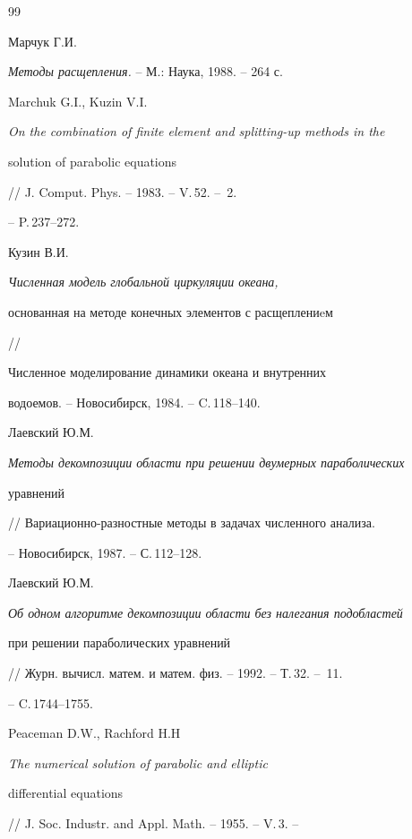 \begin{thebibliography}{99}







Марчук Г.И.


{\it Методы расщепления.} -- М.: Наука, 1988. -- 264 с.




Marchuk G.I., Kuzin V.I.


{\it On the combination of finite element and splitting-up methods in the


solution of parabolic equations}


// J. Comput. Phys. -- 1983. -- V.\,52. -- \No\,2.


-- P.\,237--272.




Кузин В.И. {\it Численная модель глобальной циркуляции океана,


основанная на методе конечных элементов с расщеплениeм} //


Численное моделирование динамики океана и внутренних


водоемов. -- Новосибирск, 1984. -- C.\,118--140.




Лаевский Ю.М.


{\it Методы декомпозиции области при решении двумерных параболических


уравнений}


// Вариационно-разностные методы в задачах численного анализа.


-- Новосибирск, 1987. -- С.\,112--128.




Лаевский Ю.М.


{\it Об одном алгоритме декомпозиции области без налегания подобластей


при решении параболических уравнений}


// Журн. вычисл. матем. и матем. физ. -- 1992. -- Т.\,32. -- \No\,11.


-- C.\,1744--1755.




Peaceman D.W., Rachford H.H


{\it The numerical solution of parabolic and elliptic


differential equations}


// J. Soc. Industr. and Appl. Math. -- 1955. -- V.\,3. --



\end{thebibliography}
